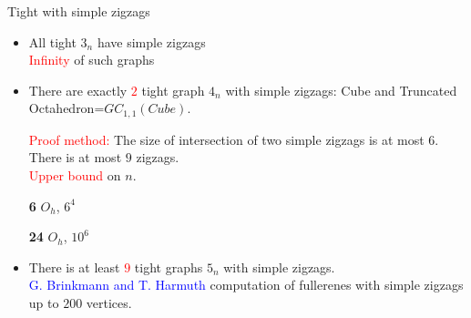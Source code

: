 \documentclass[%
pdf,
colorBG,
slideColor,
]{prosper}
\begin{document}
\begin{slide}{Tight with simple zigzags}

\begin{itemize}
\item All tight $3_n$ have simple zigzags\\
\textcolor{red}{Infinity} of such graphs
\item There are exactly \textcolor{red}{$2$} tight graph $4_n$ with simple zigzags: Cube and Truncated Octahedron=$GC_{1,1}(Cube)$.\\
\begin{minipage}{5.0cm}
\textcolor{red}{Proof method:} The size of intersection of two simple zigzags is at most $6$. There is at most $9$ zigzags.\\
\textcolor{red}{Upper bound} on $n$.
\end{minipage}
\begin{minipage}{5.2cm}
\begin{minipage}{2.5cm}
\centering
{}\par
{\bf 6} \quad $O_h$, $6^4$
\end{minipage}
\begin{minipage}{2.5cm}
\centering
{}\par
{\bf 24} \quad $O_{h}$, $10^6$
\end{minipage}
\end{minipage}

\item There is at least \textcolor{red}{$9$} tight graphs $5_n$ with simple zigzags.\\
\textcolor{blue}{G. Brinkmann and T. Harmuth} computation of fullerenes with simple zigzags up to $200$ vertices.
\end{itemize}

\end{slide}
\end{document}
